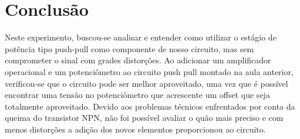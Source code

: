  \section{Conclusão} \label{sec:conclusao}
    Neste experimento, buscou-se analisar e entender como utilizar o estágio de potência tipo push-pull como componente de nosso circuito, mas sem comprometer o sinal com grades distorções.
    Ao adicionar um amplificador operacional e um potenciômetro ao circuito push pull montado na aula anterior, verificou-se que o circuito pode ser melhor aproveitado, uma vez que é possível encontrar uma tensão no potenciômetro que acrescente um offset que seja totalmente aproveitado.
    Devido aos problemas técnicos enfrentados por conta da queima do transistor NPN, não foi possível avaliar o quão mais preciso e com menos distorções a adição dos novos elementos proporcionou ao circuito.